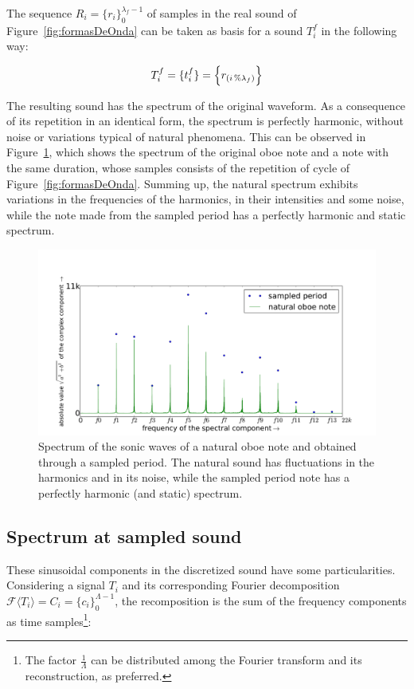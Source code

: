 The sequence $R_i=\{ r_i \}_0^{\lambda_f-1}$ of samples in the real sound of Figure~\ref{fig:formasDeOnda} can be taken as basis for a sound $T_i^f$ in the following way: 

\begin{equation}\label{sampleandoFormaDeOnda}
     T^f_i=\{ t_i^f \}=\Bigl\{ r_{(i\,\%\lambda_{f})} \Bigr\}
\end{equation}

The resulting sound has the spectrum of the original waveform. As a consequence of its repetition in an identical form, the spectrum is perfectly harmonic, without noise or variations typical of natural phenomena. This can be observed in Figure~\ref{fig:espectroOboe}, which shows the spectrum of the original oboe note and a note with the same duration, whose samples consists of the repetition of cycle of Figure~\ref{fig:formasDeOnda}. Summing up, the natural spectrum exhibits variations in the frequencies of the harmonics, in their intensities and some noise, while the note made from the sampled period has a perfectly harmonic and static spectrum.

\begin{figure}
    \centering
        \includegraphics[width=.7\textwidth]{figures/oboeNaturalSampledSpectrum}
	\caption{Spectrum of the sonic waves of a natural oboe note and obtained through a sampled period. The natural sound has fluctuations in the harmonics and in its noise, while the sampled period note has a perfectly harmonic (and static) spectrum.}
        \label{fig:espectroOboe}
\end{figure}


\subsection{Spectrum at sampled sound}
These sinusoidal components in the discretized sound have some particularities. Considering a signal $T_i$ and its corresponding Fourier decomposition $\mathcal{F}\langle T_i\rangle=C_i=\{c_i\}_0^{\Lambda-1}$, the recomposition is the sum of the frequency components as time samples\footnote{The factor $\frac{1}{\Lambda}$ can be distributed among the Fourier transform and its reconstruction, as preferred.}:

